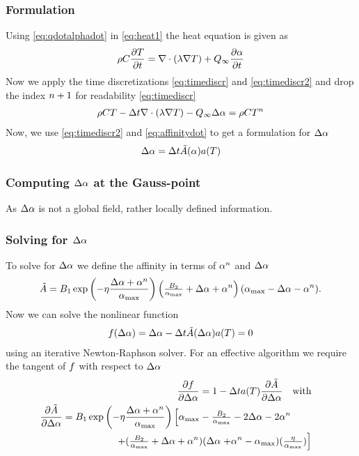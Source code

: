 \subsubsection{Formulation}
Using \eqref{eq:qdotalphadot} in \eqref{eq:heat1}
the heat equation is given as
\begin{align}
	\rho C \frac{\partial T}{\partial t} = \nabla \cdot (\lambda \nabla T) + Q_{\infty}\frac{\partial  \alpha}{\partial t} 
\end{align}
Now we apply the time discretizations \eqref{eq:timediscr} and \eqref{eq:timediscr2} and drop the index $n+1$ for readability \eqref{eq:timediscr}
\begin{align}
	\rho C T  - {\Delta t} \nabla \cdot (\lambda \nabla T) - Q_{\infty}\Delta \alpha
	= \rho C T^{n} \label{eq:heat2}
\end{align}
Now, we use \eqref{eq:timediscr2} and \eqref{eq:affinitydot} to get a formulation for $\Delta \alpha$
\begin{align}
	\Delta \alpha = \Delta t \tilde{A}( \alpha)a(T) \label{eq:deltaalpha}
\end{align}
\subsubsection{Computing \texorpdfstring{$\Delta \alpha$}{change in DoH} at the Gauss-point}
As $\Delta \alpha$ is not a global field, rather locally defined information.
\subsubsection{Solving for \texorpdfstring{$\Delta \alpha$}{change in DoH}}
To solve for $\Delta \alpha$ we define the affinity in terms of $ \alpha^{n}$ and $\Delta \alpha$
\begin{align}
	\tilde{A} = B_1\exp\left(-\eta \frac{\Delta \alpha+\alpha^{n}}{\alpha_{\text{max}}}\right) \left(\tfrac{B_2}{\alpha_{\text{max}}} + \Delta\alpha+\alpha^{n}\right) (\alpha_{\text{max}} - \Delta\alpha - \alpha^{n}).
\end{align}
Now we can solve the nonlinear function 
\begin{align}
	f(\Delta\alpha) = \Delta\alpha - \Delta t \tilde{A}(\Delta\alpha)a(T) = 0
\end{align}
using an iterative Newton-Raphson solver. For an effective algorithm we require the tangent of $f$ with respect to $\Delta\alpha$
\begin{align}
	\dfrac{\partial f}{\partial \Delta\alpha} = 1 - \Delta t a(T) \dfrac{\partial\tilde{A}}{\partial \Delta\alpha} \quad\text{with}\\
	\dfrac{\partial\tilde{A}}{\partial \Delta\alpha} = B_1\exp\left(-\eta \frac{\Delta\alpha+\alpha^{n}}{\alpha_{\text{max}}}\right)\left[
	\alpha_{\text{max}} - \tfrac{B_2}{\alpha_{\text{max}}} - 2\Delta\alpha - 2 \alpha^{n}\right.\quad\quad&\nonumber\\
	+ (\tfrac{B_2}{\alpha_{\text{max}}} + \Delta\alpha+\alpha^{n})(\Delta\alpha\left.+ \alpha^{n} - \alpha_{\text{max}})(\tfrac{\eta}{\alpha_{\text{max}}})\right]&
\end{align}
